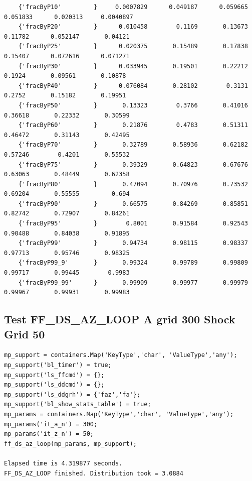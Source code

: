 \documentclass[
]{book}
\begin{document}
\begin{verbatim}
    {'fracByP10'         }     0.0007829      0.049187      0.059665      0.051833      0.020313     0.0040897 
    {'fracByP20'         }      0.010458        0.1169       0.13673       0.11782      0.052147       0.04121 
    {'fracByP25'         }      0.020375       0.15489       0.17838       0.15407      0.072616      0.071271 
    {'fracByP30'         }      0.033945       0.19501       0.22212        0.1924       0.09561       0.10878 
    {'fracByP40'         }      0.076084       0.28102        0.3131        0.2752       0.15182       0.19951 
    {'fracByP50'         }       0.13323        0.3766       0.41016       0.36618       0.22332       0.30599 
    {'fracByP60'         }       0.21876        0.4783       0.51311       0.46472       0.31143       0.42495 
    {'fracByP70'         }       0.32789       0.58936       0.62182       0.57246        0.4201       0.55532 
    {'fracByP75'         }       0.39329       0.64823       0.67676       0.63063       0.48449       0.62358 
    {'fracByP80'         }       0.47094       0.70976       0.73532       0.69204       0.55555         0.694 
    {'fracByP90'         }       0.66575       0.84269       0.85851       0.82742       0.72907       0.84261 
    {'fracByP95'         }        0.8001       0.91584       0.92543       0.90488       0.84038       0.91895 
    {'fracByP99'         }       0.94734       0.98115       0.98337       0.97713       0.95746       0.98325 
    {'fracByP99_9'       }       0.99324       0.99789       0.99809       0.99717       0.99445        0.9983 
    {'fracByP99_99'      }       0.99909       0.99977       0.99979       0.99967       0.99931       0.99983 
\end{verbatim}

\hypertarget{test-ff_ds_az_loop-a-grid-300-shock-grid-50}{%
\subsection{Test FF\_DS\_AZ\_LOOP A grid 300 Shock Grid 50}\label{test-ff_ds_az_loop-a-grid-300-shock-grid-50}}

\begin{verbatim}
mp_support = containers.Map('KeyType','char', 'ValueType','any');
mp_support('bl_timer') = true;
mp_support('ls_ffcmd') = {};
mp_support('ls_ddcmd') = {};
mp_support('ls_ddgrh') = {'faz','fa'};
mp_support('bl_show_stats_table') = true;
mp_params = containers.Map('KeyType','char', 'ValueType','any');
mp_params('it_a_n') = 300;
mp_params('it_z_n') = 50;
ff_ds_az_loop(mp_params, mp_support);

Elapsed time is 4.319877 seconds.
FF_DS_AZ_LOOP finished. Distribution took = 3.0884
\end{verbatim}
\end{document}
